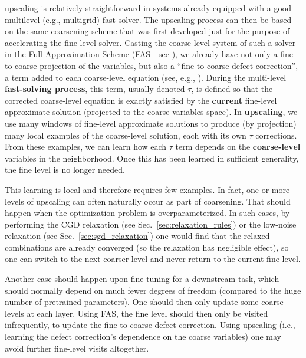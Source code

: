\documentclass{article} %
\begin{document}
upscaling is relatively straightforward in systems already equipped with a good multilevel (e.g., multigrid) fast solver. The upscaling process can then be based on the same coarsening scheme that was first developed just for the purpose of accelerating the fine-level solver. Casting the coarse-level system of such a solver in the Full Approximation Scheme (FAS - see \cite{brandt77}), we already have not only a fine-to-coarse projection of the variables, but also a ``fine-to-coarse defect correction'', a term added to each coarse-level equation (see, e.g., \cite[Sec.~8.2]{guide}). During the multi-level \textbf{fast-solving process}, this term, usually denoted $\tau$, is defined so that the corrected coarse-level equation is exactly satisfied by the \textbf{current} fine-level approximate solution (projected to the coarse variables space). In \textbf{upscaling}, we use many windows of fine-level approximate solutions to produce (by projection) many local examples of the coarse-level solution, each with its own $\tau$ corrections. From these examples, we can learn how each $\tau$ term depends on the \textbf{coarse-level} variables in the neighborhood. Once this has been learned in sufficient generality, the fine level is no longer needed. 

This learning is local and therefore requires few examples. In fact, one or more levels of upscaling can often naturally occur as part of coarsening. That should happen when the optimization problem is overparameterized. In such cases, by performing the CGD relaxation (see Sec.~\ref{sec:relaxation_rules}) or the low-noise relaxation (see Sec.~\ref{sec:sgd_relaxation}) one would find that the relaxed combinations are already converged (so the relaxation has negligible effect), so one can switch to the next coarser level and never return to the current fine level.

Another case should happen upon fine-tuning for a downstream task, which should normally depend on much fewer degrees of freedom (compared to the huge number of pretrained parameters). One should then only update some coarse levels at each layer. Using FAS, the fine level should then only be visited infrequently, to update the fine-to-coarse defect correction. Using upscaling (i.e., learning the defect correction's dependence on the coarse variables) one may avoid further fine-level visits altogether.


\end{document}
